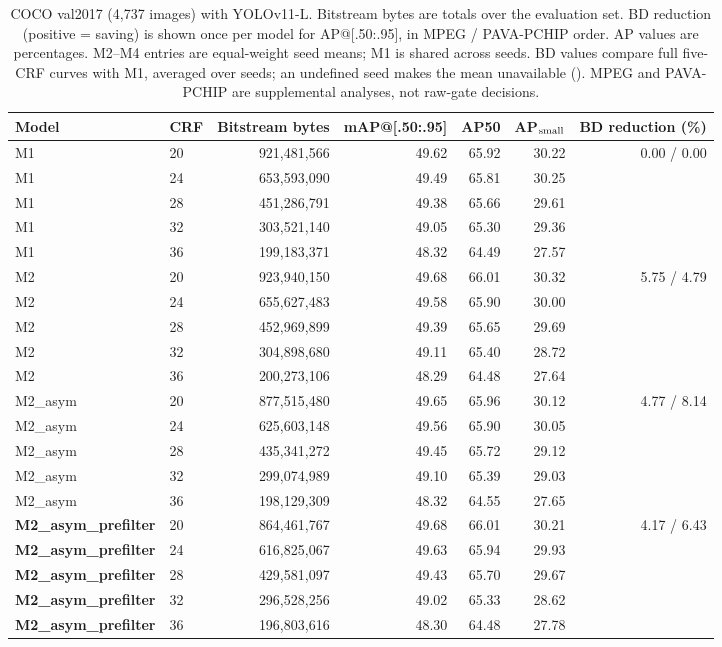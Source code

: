 \begin{table}[t]
\centering
\small
\setlength{\tabcolsep}{3pt}
\caption{COCO val2017 (4,737 images) with YOLOv11-L. Bitstream bytes are totals over the evaluation set. BD reduction (positive = saving) is shown once per model for AP@[.50:.95], in MPEG / PAVA-PCHIP order. AP values are percentages. M2--M4 entries are equal-weight seed means; M1 is shared across seeds. BD values compare full five-CRF curves with M1, averaged over seeds; an undefined seed makes the mean unavailable (\textemdash). MPEG and PAVA-PCHIP are supplemental analyses, not raw-gate decisions. }
\label{tab:m1-m4-coco}
\begin{tabular}{llrrrrr}
\toprule
Model & CRF & Bitstream bytes & mAP@[.50:.95] & AP50 & AP$_{\rm small}$ & BD reduction (\%) \\
\midrule
M1 & 20 & 921,481,566 & 49.62 & 65.92 & 30.22 & 0.00 / 0.00 \\
M1 & 24 & 653,593,090 & 49.49 & 65.81 & 30.25 &  \\
M1 & 28 & 451,286,791 & 49.38 & 65.66 & 29.61 &  \\
M1 & 32 & 303,521,140 & 49.05 & 65.30 & 29.36 &  \\
M1 & 36 & 199,183,371 & 48.32 & 64.49 & 27.57 &  \\
\midrule
M2 & 20 & 923,940,150 & 49.68 & 66.01 & 30.32 & 5.75 / 4.79 \\
M2 & 24 & 655,627,483 & 49.58 & 65.90 & 30.00 &  \\
M2 & 28 & 452,969,899 & 49.39 & 65.65 & 29.69 &  \\
M2 & 32 & 304,898,680 & 49.11 & 65.40 & 28.72 &  \\
M2 & 36 & 200,273,106 & 48.29 & 64.48 & 27.64 &  \\
\midrule
M2_asym & 20 & 877,515,480 & 49.65 & 65.96 & 30.12 & 4.77 / 8.14 \\
M2_asym & 24 & 625,603,148 & 49.56 & 65.90 & 30.05 &  \\
M2_asym & 28 & 435,341,272 & 49.45 & 65.72 & 29.12 &  \\
M2_asym & 32 & 299,074,989 & 49.10 & 65.39 & 29.03 &  \\
M2_asym & 36 & 198,129,309 & 48.32 & 64.55 & 27.65 &  \\
\midrule
\textbf{M2_asym_prefilter} & 20 & 864,461,767 & 49.68 & 66.01 & 30.21 & 4.17 / 6.43 \\
\textbf{M2_asym_prefilter} & 24 & 616,825,067 & 49.63 & 65.94 & 29.93 &  \\
\textbf{M2_asym_prefilter} & 28 & 429,581,097 & 49.43 & 65.70 & 29.67 &  \\
\textbf{M2_asym_prefilter} & 32 & 296,528,256 & 49.02 & 65.33 & 28.62 &  \\
\textbf{M2_asym_prefilter} & 36 & 196,803,616 & 48.30 & 64.48 & 27.78 &  \\
\bottomrule
\end{tabular}
\end{table}
